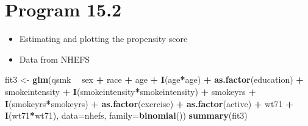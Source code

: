 \documentclass[
  10pt,
]{book}
\newenvironment{Shaded}{\begin{snugshade}}{\end{snugshade}}
\newcommand{\DataTypeTok}[1]{\textcolor[rgb]{0.13,0.29,0.53}{#1}}
\newcommand{\KeywordTok}[1]{\textcolor[rgb]{0.13,0.29,0.53}{\textbf{#1}}}
\newcommand{\NormalTok}[1]{#1}
\newcommand{\OperatorTok}[1]{\textcolor[rgb]{0.81,0.36,0.00}{\textbf{#1}}}
\newcommand{\StringTok}[1]{\textcolor[rgb]{0.31,0.60,0.02}{#1}}
\providecommand{\tightlist}{%
  \setlength{\itemsep}{0pt}\setlength{\parskip}{0pt}}
\begin{document}
\hypertarget{program-15.2}{%
\section{Program 15.2}\label{program-15.2}}

\begin{itemize}
\tightlist
\item
  Estimating and plotting the propensity score
\item
  Data from NHEFS
\end{itemize}

\begin{Shaded}
\begin{Highlighting}[]
\NormalTok{fit3 <-}\StringTok{ }\KeywordTok{glm}\NormalTok{(qsmk }\OperatorTok{~}\StringTok{ }\NormalTok{sex }\OperatorTok{+}\StringTok{ }\NormalTok{race }\OperatorTok{+}\StringTok{ }\NormalTok{age }\OperatorTok{+}\StringTok{ }\KeywordTok{I}\NormalTok{(age}\OperatorTok{*}\NormalTok{age) }\OperatorTok{+}\StringTok{ }\KeywordTok{as.factor}\NormalTok{(education)}
            \OperatorTok{+}\StringTok{ }\NormalTok{smokeintensity }\OperatorTok{+}\StringTok{ }\KeywordTok{I}\NormalTok{(smokeintensity}\OperatorTok{*}\NormalTok{smokeintensity) }\OperatorTok{+}\StringTok{ }\NormalTok{smokeyrs}
            \OperatorTok{+}\StringTok{ }\KeywordTok{I}\NormalTok{(smokeyrs}\OperatorTok{*}\NormalTok{smokeyrs) }\OperatorTok{+}\StringTok{ }\KeywordTok{as.factor}\NormalTok{(exercise) }\OperatorTok{+}\StringTok{ }\KeywordTok{as.factor}\NormalTok{(active)}
            \OperatorTok{+}\StringTok{ }\NormalTok{wt71 }\OperatorTok{+}\StringTok{ }\KeywordTok{I}\NormalTok{(wt71}\OperatorTok{*}\NormalTok{wt71), }\DataTypeTok{data=}\NormalTok{nhefs, }\DataTypeTok{family=}\KeywordTok{binomial}\NormalTok{())}
\KeywordTok{summary}\NormalTok{(fit3)}
\end{Highlighting}
\end{Shaded}
\end{document}
